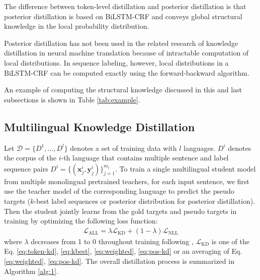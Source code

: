 \documentclass[11pt,a4paper]{article}
\newcommand{\xvec}{\mathbf{x}}
\newcommand{\yvec}{\mathbf{y}}
\newcommand{\mcL}{\mathcal{L}}
\begin{document}
The difference between token-level distillation and posterior distillation is that posterior distillation is based on BiLSTM-CRF and conveys global structural knowledge in the local probability distribution. 

Posterior distillation has not been used in the related research of knowledge distillation in neural machine translation because of intractable computation of local distributions. In sequence labeling, however, local distributions in a BiLSTM-CRF can be computed exactly using the forward-backward algorithm. 

An example of computing the structural knowledge discussed in this and last subsections is shown in Table \ref{tab:example}.



\subsection{Multilingual Knowledge Distillation}
Let $\mathcal{D}=\{D^1,\dots,D^l\}$ denotes a set of training data with $l$ languages. $D^i$ denotes the corpus of the $i$-th language that contains multiple sentence and label sequence pairs $D^i=\{(\xvec^i_j,\yvec^i_j)\}_{j=1}^{m_i}$. To train a single multilingual student model from multiple monolingual pretrained teachers, for each input sentence, we first use the teacher model of the corresponding language to predict the pseudo targets ($k$-best label sequences or posterior distribution for posterior distillation). Then the student jointly learns from the gold targets and pseudo targets in training by optimizing the following loss function:
\begin{align*}
\mcL_{\text{ALL}} = \lambda \mcL_{\text{KD}} + (1-\lambda) \mcL_{\text{NLL}}
\end{align*}
where $\lambda$ decreases from 1 to 0 throughout training following \citet{clark-etal-2019-bam}, $\mcL_{\text{KD}}$ is one of the Eq. \ref{eq:token-kd}, \ref{eq:kbest}, \ref{eq:weighted}, \ref{eq:pos-kd} or an averaging of Eq. \ref{eq:weighted}, \ref{eq:pos-kd}. The overall distillation process is summarized in Algorithm \ref{alg:1}.  
\end{document}
